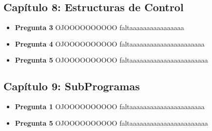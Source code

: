 \documentclass[12pt,oneside]{article}
\begin{document}
		\subsection{Capítulo 8: Estructuras de Control}	
			\begin{itemize}
				\item {\bf Pregunta 3}		
					OJOOOOOOOOOO faltaaaaaaaaaaaaaaaa
				\item {\bf Pregunta 4}
					OJOOOOOOOOOO faltaaaaaaaaaaaaaaaaaaaaaa
				\item {\bf Pregunta 5}
					OJOOOOOOOOOO faltaaaaaaaaaaaaaaaaaaaaaaa
			\end{itemize}

		\subsection{Capítulo 9: SubProgramas}      
			\begin{itemize}
				\item {\bf Pregunta 1}
					OJOOOOOOOOOO faltaaaaaaaaaaaaaaaaaaaaaa
				\item {\bf Pregunta 5}
					OJOOOOOOOOOO faltaaaaaaaaaaaaaaaaaaaaaaa
				\end{itemize}


\end{document}
